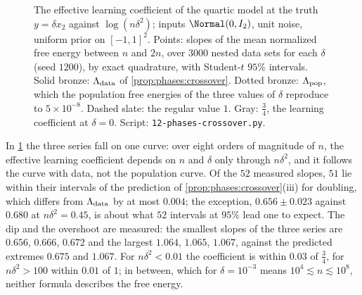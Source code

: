 \begin{refsection}
\begin{figure}[t]
\centering
{}
\caption{The effective learning coefficient of the quartic model at the truth $y=\delta x_2$ against $\log(n\delta^2)$; inputs $\Normal(0,I_2)$, unit noise, uniform prior on $[-1,1]^2$. Points: slopes of the mean normalized free energy between $n$ and $2n$, over $3000$ nested data sets for each $\delta$ (seed $1200$), by exact quadrature, with Student-$t$ $95\%$ intervals. Solid bronze: $\Lambda_{\mathrm{data}}$ of \cref{prop:phases:crossover}. Dotted bronze: $\Lambda_{\mathrm{pop}}$, which the population free energies of the three values of $\delta$ reproduce to $5\times10^{-8}$. Dashed slate: the regular value $1$. Gray: $\frac34$, the learning coefficient at $\delta=0$. Script: \texttt{12-phases-crossover.py}.}\label{fig:phases:crossover}
\end{figure}

In \cref{fig:phases:crossover} the three series fall on one curve: over eight orders of magnitude of $n$, the effective learning coefficient depends on $n$ and $\delta$ only through $n\delta^2$, and it follows the curve with data, not the population curve. Of the $52$ measured slopes, $51$ lie within their intervals of the prediction of \cref{prop:phases:crossover}(iii) for doubling, which differs from $\Lambda_{\mathrm{data}}$ by at most $0.004$; the exception, $0.656\pm0.023$ against $0.680$ at $n\delta^2=0.45$, is about what $52$ intervals at $95\%$ lead one to expect. The dip and the overshoot are measured: the smallest slopes of the three series are $0.656$, $0.666$, $0.672$ and the largest $1.064$, $1.065$, $1.067$, against the predicted extremes $0.675$ and $1.067$. For $n\delta^2<0.01$ the coefficient is within $0.03$ of $\frac34$, for $n\delta^2>100$ within $0.01$ of $1$; in between, which for $\delta=10^{-3}$ means $10^4\lesssim n\lesssim10^8$, neither formula describes the free energy.


\end{refsection}
